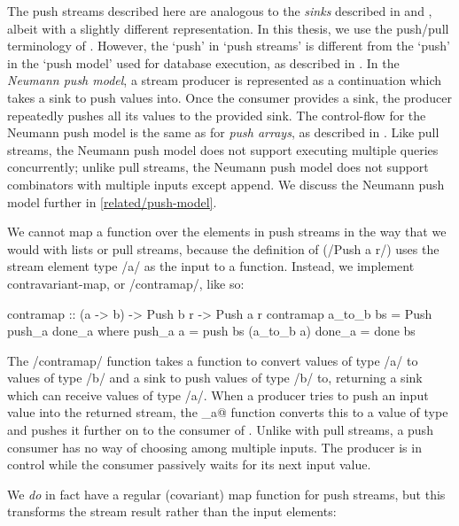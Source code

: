 The push streams described here are analogous to the \emph{sinks} described in \citet{bernardy2015duality} and \citet{lippmeier2016polarized}, albeit with a slightly different representation.
In this thesis, we use the push/pull terminology of \citet{kay2009you}.
However, the `push' in `push streams' is different from the `push' in the `push model' used for database execution, as described in \citet{neumann2011efficiently}.
In the \emph{Neumann push model}, a stream producer is represented as a continuation which takes a sink to push values into.
Once the consumer provides a sink, the producer repeatedly pushes all its values to the provided sink.
The control-flow for the Neumann push model is the same as for \emph{push arrays}, as described in \citet{claessen2012expressive}.
Like pull streams, the Neumann push model does not support executing multiple queries concurrently; unlike pull streams, the Neumann push model does not support combinators with multiple inputs except append.
We discuss the Neumann push model further in \cref{related/push-model}.


We cannot map a function over the elements in push streams in the way that we would with lists or pull streams, because the definition of (\Hs/Push a r/) uses the stream element type \Hs/a/ as the input to a function.
Instead, we implement contravariant-map, or \Hs/contramap/, like so:

\begin{haskell}
contramap :: (a -> b) -> Push b r -> Push a r
contramap a_to_b bs = Push push_a done_a
 where
  push_a a = push bs (a_to_b a)
  done_a   = done bs
\end{haskell}

The \Hs/contramap/ function takes a function to convert values of type \Hs/a/ to values of type \Hs/b/ and a sink to push values of type \Hs/b/ to, returning a sink which can receive values of type \Hs/a/.
When a producer tries to push an input value into the returned stream, the \Hs@push_a@ function converts this to a value of type \Hs@b@ and pushes it further on to the consumer of \Hs@b@.
Unlike with pull streams, a push consumer has no way of choosing among multiple inputs.
The producer is in control while the consumer passively waits for its next input value.

We \emph{do} in fact have a regular (covariant) map function for push streams, but this transforms the stream result rather than the input elements:

